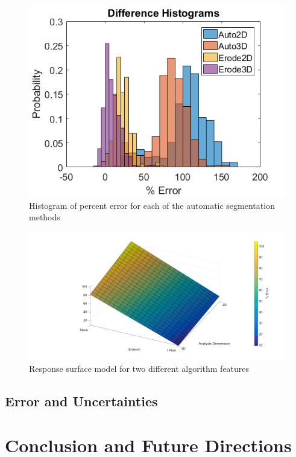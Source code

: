 \documentclass[12pt]{article}
\begin{document}
\begin{figure}[H]
	\centering
	\includegraphics[width=1\textwidth]{DifferenceHistograms.png}
	\caption{Histogram of percent error for each of the automatic segmentation methods}
	\label{fig:DiffHist}
\end{figure}

\begin{figure}[H]
	\centering
	\includegraphics[width=1\textwidth]{ResponseSurface.png}
	\caption{Response surface model for two different algorithm features}
	\label{fig:Surf}
\end{figure}
\subsection{Error and Uncertainties} 

\section{Conclusion and Future Directions} 





\end{document}
